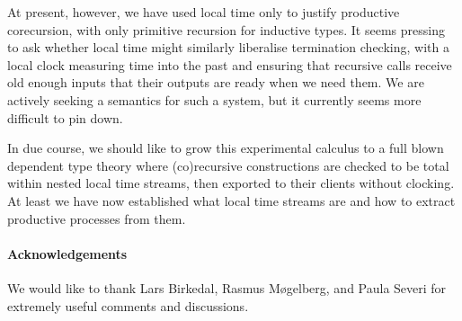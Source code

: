 \documentclass[natbib]{sigplanconf}
\begin{document}
At present, however, we have used local time only to justify
productive corecursion, with only primitive recursion for inductive
types. It seems pressing to ask whether local time might similarly
liberalise termination checking, with a local clock measuring time into
the past and ensuring that recursive calls receive old enough inputs
that their outputs are ready when we need them. We are actively
seeking a semantics for such a system, but it currently seems more
difficult to pin down.

In due course, we should like to grow this experimental calculus to a
full blown dependent type theory where (co)recursive constructions are
checked to be total within nested local time streams, then exported to their
clients without clocking. At least we have now established what local
time streams are and how to extract productive processes from them.


\paragraph{Acknowledgements} We would like to thank Lars Birkedal,
Rasmus M{\o}gelberg, and Paula Severi for extremely useful comments
and discussions.
\end{document}
